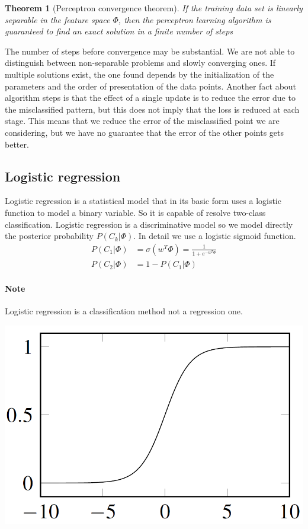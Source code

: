 \documentclass[main.tex]{subfiles}
\newtheorem{theorem}{Theorem}[section]
\begin{document}
\begin{theorem}[Perceptron convergence theorem]
    If the training data set is linearly separable in the feature space $\Phi$, then the perceptron learning algorithm is guaranteed to find an exact solution in a finite number of steps
\end{theorem}
The number of steps before convergence may be substantial. We are not able to distinguish between non-separable problems and slowly converging ones. If multiple solutions exist, the one found depends by the initialization of the parameters and the order of presentation of the data points.
Another fact about algorithm steps is that the effect of a single update is to reduce the error due to the misclassified pattern, but this does not imply that the loss is reduced at each stage. This means that we reduce the error of the misclassified point we are considering, but we have no guarantee that the error of the other points gets better.

\newpage
\subsection{Logistic regression}
Logistic regression is a statistical model that in its basic form uses a logistic function to model a binary variable. So it is capable of resolve two-class classification.
Logistic regression is a discriminative model so we model directly the posterior probability $P(C_k|\Phi)$. In detail we use a logistic sigmoid function\footnotemark.
\begin{align}
    P(C_1|\Phi) & = \sigma(w^T \Phi) = \frac{1}{1+e^{-w^T\Phi}} \\
    P(C_2|\Phi) & = 1- P(C_1|\Phi)
\end{align}

\paragraph{Note} Logistic regression is a classification method not a regression one.

\begin{center}
    \includegraphics[scale=0.4]{img/Sigmoid.PNG}
\end{center}
\end{document}
